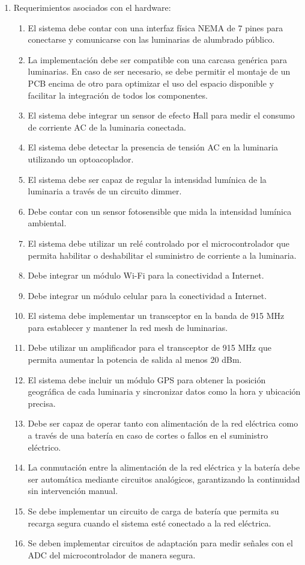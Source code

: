 \documentclass[
11pt, %
]{charter}
\begin{document}
\begin{enumerate}
	\item Requerimientos asociados con el hardware:
		\begin{enumerate}
			\item El sistema debe contar con una interfaz física NEMA de 7 pines para conectarse y comunicarse con las luminarias de alumbrado público.
			\item La implementación debe ser compatible con una carcasa genérica para luminarias. En caso de ser necesario, se debe permitir el montaje de un PCB encima de otro para optimizar el uso del espacio disponible y facilitar la integración de todos los componentes.
			\item  El sistema debe integrar un sensor de efecto Hall para medir el consumo de corriente AC de la luminaria conectada.
			\item El sistema debe detectar la presencia de tensión AC en la luminaria utilizando un optoacoplador.
 			\item El sistema debe ser capaz de regular la intensidad lumínica de la luminaria a través de un circuito dimmer.
			\item Debe contar con un sensor fotosensible que mida la intensidad lumínica ambiental.
			\item El sistema debe utilizar un relé controlado por el microcontrolador que permita habilitar o deshabilitar el suministro de corriente a la luminaria.
			\item Debe integrar un módulo Wi-Fi para la conectividad a Internet.
			\item Debe integrar un módulo celular para la conectividad a Internet.
			\item El sistema debe implementar un transceptor en la banda de 915 MHz para establecer y mantener la red mesh de luminarias.
			\item Debe utilizar un amplificador para el transceptor de 915 MHz que permita aumentar la potencia de salida al menos 20 dBm.
			\item El sistema debe incluir un módulo GPS para obtener la posición geográfica de cada luminaria y sincronizar datos como la hora y ubicación precisa.
			\item Debe ser capaz de operar tanto con alimentación de la red eléctrica como a través de una batería en caso de cortes o fallos en el suministro eléctrico. 
			\item La conmutación entre la alimentación de la red eléctrica y la batería debe ser automática mediante circuitos analógicos, garantizando la continuidad sin intervención manual.
			\item Se debe implementar un circuito de carga de batería que permita su recarga segura cuando el sistema esté conectado a la red eléctrica.
			\item Se deben implementar circuitos de adaptación para medir señales con el ADC del microcontrolador de manera segura.
		\end{enumerate}


\end{enumerate}
\end{document}
